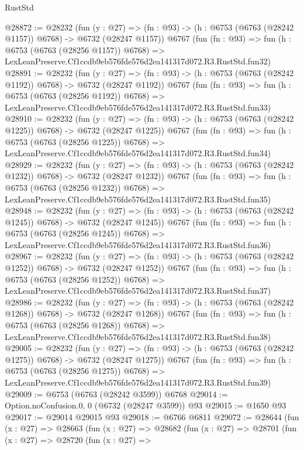 \begin{lexlean}{RustStd}
\begin{coremodule}
@28872 := @28232
    (fun (y : @27) =>
    (fn : @93) -> (h : @6753 (@6763 (@28242 @1157)) @6768) -> @6732 (@28247 @1157))
    @6767
    (fun (fn : @93) =>
    fun (h : @6753 (@6763 (@28256 @1157)) @6768) =>
    LexLeanPreserve.Cf1ccdb9eb576fde576d2ea141317d072.R3.RustStd.fun32)
@28891 := @28232
    (fun (y : @27) =>
    (fn : @93) -> (h : @6753 (@6763 (@28242 @1192)) @6768) -> @6732 (@28247 @1192))
    @6767
    (fun (fn : @93) =>
    fun (h : @6753 (@6763 (@28256 @1192)) @6768) =>
    LexLeanPreserve.Cf1ccdb9eb576fde576d2ea141317d072.R3.RustStd.fun33)
@28910 := @28232
    (fun (y : @27) =>
    (fn : @93) -> (h : @6753 (@6763 (@28242 @1225)) @6768) -> @6732 (@28247 @1225))
    @6767
    (fun (fn : @93) =>
    fun (h : @6753 (@6763 (@28256 @1225)) @6768) =>
    LexLeanPreserve.Cf1ccdb9eb576fde576d2ea141317d072.R3.RustStd.fun34)
@28929 := @28232
    (fun (y : @27) =>
    (fn : @93) -> (h : @6753 (@6763 (@28242 @1232)) @6768) -> @6732 (@28247 @1232))
    @6767
    (fun (fn : @93) =>
    fun (h : @6753 (@6763 (@28256 @1232)) @6768) =>
    LexLeanPreserve.Cf1ccdb9eb576fde576d2ea141317d072.R3.RustStd.fun35)
@28948 := @28232
    (fun (y : @27) =>
    (fn : @93) -> (h : @6753 (@6763 (@28242 @1245)) @6768) -> @6732 (@28247 @1245))
    @6767
    (fun (fn : @93) =>
    fun (h : @6753 (@6763 (@28256 @1245)) @6768) =>
    LexLeanPreserve.Cf1ccdb9eb576fde576d2ea141317d072.R3.RustStd.fun36)
@28967 := @28232
    (fun (y : @27) =>
    (fn : @93) -> (h : @6753 (@6763 (@28242 @1252)) @6768) -> @6732 (@28247 @1252))
    @6767
    (fun (fn : @93) =>
    fun (h : @6753 (@6763 (@28256 @1252)) @6768) =>
    LexLeanPreserve.Cf1ccdb9eb576fde576d2ea141317d072.R3.RustStd.fun37)
@28986 := @28232
    (fun (y : @27) =>
    (fn : @93) -> (h : @6753 (@6763 (@28242 @1268)) @6768) -> @6732 (@28247 @1268))
    @6767
    (fun (fn : @93) =>
    fun (h : @6753 (@6763 (@28256 @1268)) @6768) =>
    LexLeanPreserve.Cf1ccdb9eb576fde576d2ea141317d072.R3.RustStd.fun38)
@29005 := @28232
    (fun (y : @27) =>
    (fn : @93) -> (h : @6753 (@6763 (@28242 @1275)) @6768) -> @6732 (@28247 @1275))
    @6767
    (fun (fn : @93) =>
    fun (h : @6753 (@6763 (@28256 @1275)) @6768) =>
    LexLeanPreserve.Cf1ccdb9eb576fde576d2ea141317d072.R3.RustStd.fun39)
@29009 := @6753 (@6763 (@28242 @3599)) @6768
@29014 := Option.noConfusion.{0, 0} (@6732 (@28247 @3599)) @93
@29015 := @1650 @93
@29017 := @29014 @29015 @93
@29018 := @6766 @6811
@29072 := @28644
    (fun (x : @27) =>
    @28663
      (fun (x : @27) =>
      @28682
        (fun (x : @27) =>
        @28701
          (fun (x : @27) =>
          @28720
            (fun (x : @27) =>

\end{coremodule}
\end{lexlean}
